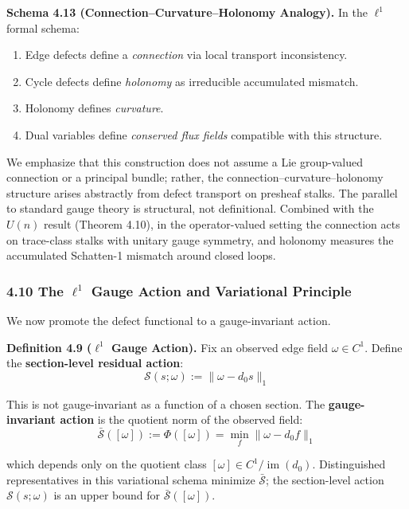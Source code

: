\documentclass[
]{article}
\providecommand{\tightlist}{%
  \setlength{\itemsep}{0pt}\setlength{\parskip}{0pt}}
\providecommand{\tightlist}{%
  \setlength{\itemsep}{0pt}\setlength{\parskip}{0pt}}
\begin{document}
\textbf{Schema 4.13 (Connection--Curvature--Holonomy Analogy).} In the \(\ell^1\) formal schema:

\begin{enumerate}
\def\labelenumi{\arabic{enumi}.}
\tightlist
\item
  Edge defects define a \emph{connection} via local transport inconsistency.
\item
  Cycle defects define \emph{holonomy} as irreducible accumulated mismatch.
\item
  Holonomy defines \emph{curvature}.
\item
  Dual variables define \emph{conserved flux fields} compatible with this structure.
\end{enumerate}

We emphasize that this construction does not assume a Lie group-valued connection or a principal bundle; rather, the connection--curvature--holonomy structure arises abstractly from defect transport on presheaf stalks. The parallel to standard gauge theory is structural, not definitional. Combined with the \(U(n)\) result (Theorem 4.10), in the operator-valued setting the connection acts on trace-class stalks with unitary gauge symmetry, and holonomy measures the accumulated Schatten-1 mismatch around closed loops.

\subsubsection{\texorpdfstring{4.10 The \(\ell^1\) Gauge Action and Variational Principle}{4.10 The \textbackslash ell\^{}1 Gauge Action and Variational Principle}}\label{the-ell1-gauge-action-and-variational-principle}

We now promote the defect functional to a gauge-invariant action.

\textbf{Definition 4.9 (\(\ell^1\) Gauge Action).} Fix an observed edge field \(\omega\in C^1\). Define the \textbf{section-level residual action}:
\[ \mathcal{S}(s;\omega) := \|\omega-d_0 s\|_1 \]

This is not gauge-invariant as a function of a chosen section. The \textbf{gauge-invariant action} is the quotient norm of the observed field:
\[ \bar{\mathcal{S}}([\omega]) := \Phi([\omega]) = \min_f \|\omega - d_0 f\|_1 \]

which depends only on the quotient class \([\omega]\in C^1/\operatorname{im}(d_0)\). Distinguished representatives in this variational schema minimize \(\bar{\mathcal{S}}\); the section-level action \(\mathcal{S}(s;\omega)\) is an upper bound for \(\bar{\mathcal{S}}([\omega])\).
\end{document}
